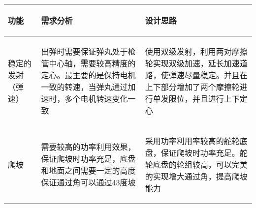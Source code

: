 
\begin{longtable}{ p{2cm} | p{7.8cm} | p{6cm} |}

    \hline

    \endfoot
    
    \rowcolor{tabhdcolor}

        \begin{center}
            功能
        \end{center} &
        \begin{center}
            需求分析
        \end{center} &
        \begin{center}
            设计思路
        \end{center} \\

    \hline

    \endhead

        \begin{center}
            稳定的发射（弹速）
        \end{center} &
        \begin{center}
            出弹时需要保证弹丸处于枪管中心轴，需要较高精度的定心。最主要的是保持电机一致的转速，当弹丸通过加速时，多个电机转速变化一致
        \end{center} &
        \begin{center}
            使用双级发射，利用两对摩擦轮实现双级加速，延长加速道路，使弹速尽量稳定。并且在上下部分增加了两个摩擦轮进行单发限位，并且进行上下定心
        \end{center} \\
        
    \hline

        \begin{center}
            爬坡
        \end{center} &
        \begin{center}
            需要较高的功率利用效果，保证爬坡时功率充足，底盘和地面之间需要一定的高度保证通过角可以通过43度坡
        \end{center} &
        \begin{center}
            采用功率利用率较高的舵轮底盘，保证爬坡时功率充足。舵轮底盘的轮组较高，可以完美的实现增大通过角，提高爬坡能力
        \end{center} \\
        

\end{longtable}
